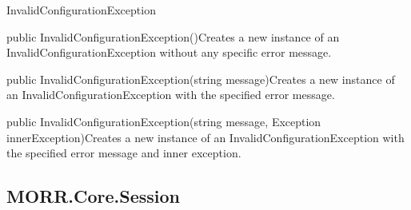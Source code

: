 \begin{class}{InvalidConfigurationException}



    \begin{constructors}
        \begin{constructor}{public InvalidConfigurationException()}{Creates a new instance of an InvalidConfigurationException without any specific error message.}
        \end{constructor}
        \begin{constructor}{public InvalidConfigurationException(string message)}{Creates a new instance of an InvalidConfigurationException with the specified error message.}
            \begin{parameters}
            \end{parameters}
        \end{constructor}
        \begin{constructor}{public InvalidConfigurationException(string message, Exception innerException)}{Creates a new instance of an InvalidConfigurationException with the specified error message and inner exception.}
            \begin{parameters}
            \end{parameters}
        \end{constructor}
    \end{constructors}
\end{class}

\subsection*{MORR.Core.Session}

